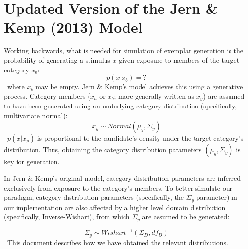 \documentclass[12pt]{article}
\begin{document}
\VerbatimFootnotes

\section*{Updated Version of the Jern \& Kemp (2013) Model}

Working backwards, what is needed for simulation of exemplar generation is the probability of generating a stimulus $x$ given exposure to members of the target category $x_b$:
\
\begin{equation}
p(x | x_b) = ?
\end{equation}
\
where $x_b$ may be empty. Jern \& Kemp's model achieves this using a generative process. Category members ($x_a$ or $x_b$; more generally written as $x_y$) are assumed to have been generated using an underlying category distribution (specifically, multivariate normal):
\
\begin{equation}
  x_y \sim Normal(\mu_{y}, \Sigma_{y})
\end{equation}
\
$p(x | x_y)$ is proportional to the candidate's density under the target category's distribution. Thus, obtaining the category distribution parameters $(\mu_{y}, \Sigma_{y})$ is key for generation.

In Jern \& Kemp's original model, category distribution parameters are inferred exclusively from exposure to the category's members. To better simulate our paradigm, category distribution parameters (specifically, the $\Sigma_{y}$ parameter) in our implementation are also affected by a higher level domain distribution (specifically, Inverse-Wishart), from which $\Sigma_{y}$ are assumed to be generated:

\begin{equation}
  \Sigma_{y} \sim Wishart^{-1}(\Sigma_D, df_D)
\end{equation}
\
This document describes how we have obtained the relevant distributions.
\end{document}
